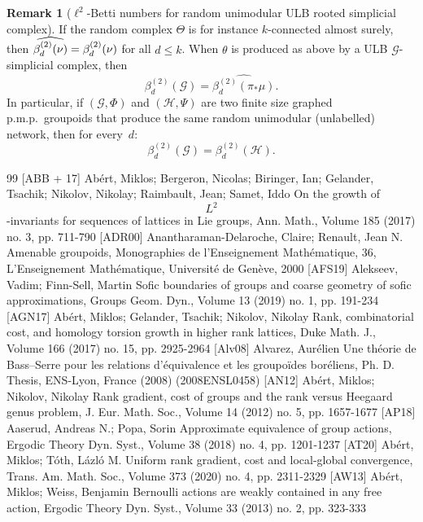 \documentclass[10pt]{amsart}
\theoremstyle{definition}
\newtheorem{rema}[cdrthm]{Remark}
\newcommand{\ch}{\mathcal{H}}
\newcommand{\cg}{\mathcal{G}}
\newcommand{\pmp}{p.m.p.\ }
\begin{document}
\begin{rema}[$\ell^2$-Betti numbers for random unimodular ULB rooted simplicial complex]
If the random complex $\Theta$ is for instance $k$-connected almost surely, then $\widehat{\beta_d^{(2)}(\nu)}=\linebreak\beta_d^{(2)}(\nu)$ for all $d\leq k$. When $\theta$ is produced as above by a ULB $\cg$-simplicial complex, then
\[
\beta^{(2)}_d(\cg)= \widehat{\beta^{(2)}_d(\pi_*\mu)}.
\]
In particular, if $(\cg,\Phi)$ and $(\ch,\Psi)$ are two finite size graphed \pmp groupoids that produce the same random unimodular (unlabelled) network, then for every~$d$:
\[
\beta^{(2)}_d(\cg)=\beta^{(2)}_d(\ch).
\]
\end{rema}



% 


\begin{thebibliography}{99}
 [ABB + 17] Abért, Miklos; Bergeron, Nicolas; Biringer, Ian; Gelander, Tsachik; Nikolov, Nikolay; Raimbault, Jean; Samet, Iddo On the growth of $${L}^2$$-invariants for sequences of lattices in Lie groups, Ann. Math., Volume 185 (2017) no. 3, pp. 711-790
 [ADR00] Anantharaman-Delaroche, Claire; Renault, Jean N. Amenable groupoids, Monographies de l’Enseignement Mathématique, 36, L’Enseignement Mathématique, Université de Genève, 2000
 [AFS19] Alekseev, Vadim; Finn-Sell, Martin Sofic boundaries of groups and coarse geometry of sofic approximations, Groups Geom. Dyn., Volume 13 (2019) no. 1, pp. 191-234
 [AGN17] Abért, Miklos; Gelander, Tsachik; Nikolov, Nikolay Rank, combinatorial cost, and homology torsion growth in higher rank lattices, Duke Math. J., Volume 166 (2017) no. 15, pp. 2925-2964
 [Alv08] Alvarez, Aurélien Une théorie de Bass–Serre pour les relations d’équivalence et les groupoïdes boréliens, Ph. D. Thesis, ENS-Lyon, France (2008) (2008ENSL0458)
 [AN12] Abért, Miklos; Nikolov, Nikolay Rank gradient, cost of groups and the rank versus Heegaard genus problem, J. Eur. Math. Soc., Volume 14 (2012) no. 5, pp. 1657-1677
 [AP18] Aaserud, Andreas N.; Popa, Sorin Approximate equivalence of group actions, Ergodic Theory Dyn. Syst., Volume 38 (2018) no. 4, pp. 1201-1237
 [AT20] Abért, Miklos; Tóth, Lázló M. Uniform rank gradient, cost and local-global convergence, Trans. Am. Math. Soc., Volume 373 (2020) no. 4, pp. 2311-2329
 [AW13] Abért, Miklos; Weiss, Benjamin Bernoulli actions are weakly contained in any free action, Ergodic Theory Dyn. Syst., Volume 33 (2013) no. 2, pp. 323-333

\end{thebibliography}
\end{document}
